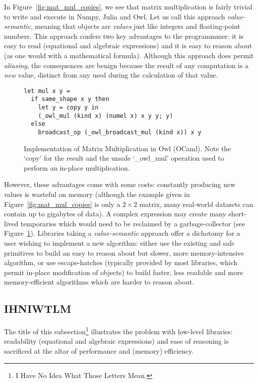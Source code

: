 In Figure~\ref{fig:mat_mul_copies}, we see that matrix multiplication is fairly
trivial to write and execute in Numpy, Julia and Owl. Let us call this approach
\emph{value-semantic}, meaning that objects are \emph{values} just like
integers and floating-point numbers. This approach confers two key advantages to the
programmmer: it is easy to read (equational and algebraic expressions) and it
is easy to reason about (as one would with a mathematical formula). Although this
approach does permit \emph{aliasing}, the consequences are benign because the
result of any computation is a \emph{new} value, distinct from any used during
the calculation of that value.

\begin{figure}[tp]
    \centering
    \begin{verbatim}
let mul x y =
  if same_shape x y then
    let y = copy y in
    (_owl_mul (kind x) (numel x) x y y; y)
  else
    broadcast_op (_owl_broadcast_mul (kind x)) x y
    \end{verbatim}
    \caption{Implementation of Matrix Multiplication in Owl (OCaml).
        Note the `copy' for the result and the unsafe `\_owl\_mul' operation
    used to perform an in-place multiplication.}\label{fig:mat_mul_owl}
\end{figure}

However, these advantages come with some costs: constantly producing new values
is wasteful on memory (although the example given in
Figure~\ref{fig:mat_mul_copies} is only a $2 \times 2$ matrix, many real-world
datasets can contain up to gigabytes of data). A complex expression may create
many short-lived temporaries which would need to be reclaimed by a
garbage-collector (see Figure~\ref{fig:mat_mul_owl}). Libraries taking a
\emph{value-semantic} approach offer a dichotomy for a user wishing to
implement a new algorithm: either use the existing and safe primitives to build
an easy to reason about but slower, more memory-intensive algorithm, or use
escape-hatches (typically provided by most libraries, which permit in-place
modification of objects) to build faster, less readable and more
memory-efficient algorithms which are harder to reason about.

\subsection{IHNIWTLM}

The title of this subsection\footnote{I Have No Idea What Those Letters Mean.}
illustrates the problem with low-level libraries: readability (equational and
algebraic expressions) and ease of reasoning is sacrificed at the altar of
performance and (memory) efficiency.

